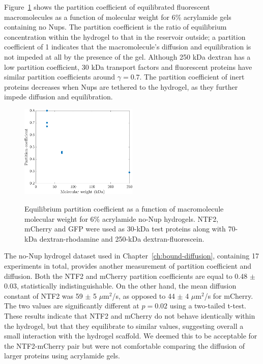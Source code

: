 Figure~\ref{fig:pc-vs-mw} shows the partition coefficient of equilibrated fluorescent macromolecules as a function of molecular weight for 6\% acrylamide gels containing no Nups.  The partition coefficient is the ratio of equilibrium concentration within the hydrogel to that in the reservoir outside; a partition coefficient of 1 indicates that the macromolecule's diffusion and equilibration is not impeded at all by the presence of the gel.  Although 250 kDa dextran has a low partition coefficient, 30 kDa transport factors and fluorescent proteins have similar partition coefficients around $\gamma = 0.7$.  The partition coefficient of inert proteins decreases when Nups are tethered to the hydrogel, as they further impede diffusion and equilibration.  

\begin{figure}
\caption{Equilibrium partition coefficient as a function of macromolecule molecular weight for 6\% acrylamide no-Nup hydrogels.  NTF2, mCherry and GFP were used as 30-kDa test proteins along with 70-kDa dextran-rhodamine and 250-kDa dextran-fluorescein.\\}
\centering
\includegraphics[width=0.5\textwidth]{figs/ch03/partition-coefficient-vs-mw}
\label{fig:pc-vs-mw}
\end{figure} 

The no-Nup hydrogel dataset used in Chapter~\ref{ch:bound-diffusion}, containing 17 experiments in total, provides another measurement of partition coefficient and diffusion.  Both the NTF2 and mCherry partition coefficients are equal to 0.48 $\pm$ 0.03, statistically indistinguishable.  On the other hand, the mean diffusion constant of NTF2 was 59 $\pm$ 5 $\mu$m$^2$/s, as opposed to 44 $\pm$ 4 $\mu$m$^2$/s for mCherry.  The two values are significantly different at $p=0.02$ using a two-tailed t-test.  These results indicate that NTF2 and mCherry do not behave identically within the hydrogel, but that they equilibrate to similar values, suggesting overall a small interaction with the hydrogel scaffold.  We deemed this to be acceptable for the NTF2-mCherry pair but were not comfortable comparing the diffusion of larger proteins using acrylamide gels.
%
%

